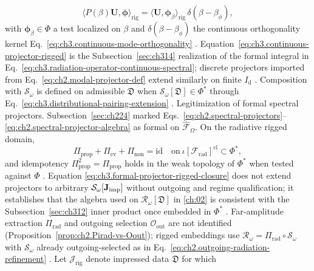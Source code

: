 \begin{equation}
\label{eq:ch3.continuous-projector-rigged}
\big\langle P(\beta)\mathbf{U},\boldsymbol{\phi}\big\rangle_{\mathrm{rig}}
=
\big\langle \mathbf{U},\boldsymbol{\phi}_\beta\rangle_{\mathrm{rig}}\,
\delta(\beta-\beta_\phi),
\end{equation}
with \(\boldsymbol{\phi}_\beta\in\Phi\) a test localized on \(\beta\) and \(\delta(\beta-\beta_\phi)\) the
continuous orthogonality kernel Eq.~\eqref{eq:ch3.continuous-mode-orthogonality} \cite{stratton1941}.
Equation~\eqref{eq:ch3.continuous-projector-rigged} is the Subsection~\ref{sec:ch314} realization of the
formal integral in Eq.~\eqref{eq:ch3.radiation-operator-continuous-spectral}; discrete projectors imported
from Eq.~\eqref{eq:ch2.modal-projector-def} extend similarly on finite \(I_{\mathrm{d}}\)
\cite{stratton1941}. Composition with \(\mathcal{S}_\omega\) is defined on admissible
\(\mathfrak{D}\) when \(\mathcal{S}_\omega[\mathfrak{D}]\in\Phi^{*}\) through
Eq.~\eqref{eq:ch3.distributional-pairing-extension} \cite{stratton1941}.
Legitimization of formal spectral projectors. Subsection~\ref{sec:ch224} marked Eqs.~\eqref{eq:ch2.spectral-projectors}--\eqref{eq:ch2.spectral-projector-algebra}
as formal on \(\widehat{\mathcal{F}}_\Omega\). On the radiative rigged domain,
\begin{equation}
\label{eq:ch3.formal-projector-rigged-closure}
\Pi_{\mathrm{prop}}+\Pi_{\mathrm{ev}}+\Pi_{\mathrm{non}}
=
\mathrm{id}
\quad\text{on}\ \iota[\mathcal{F}_{\mathrm{rad}}]^{\mathrm{cl}}\subset\Phi^{*},
\end{equation}
and idempotency \(\Pi_{\mathrm{prop}}^{2}=\Pi_{\mathrm{prop}}\) holds in the weak topology of
\(\Phi^{*}\) when tested against \(\Phi\) \cite{stratton1941}. Equation
\eqref{eq:ch3.formal-projector-rigged-closure} does not extend projectors to arbitrary
\(\mathcal{S}_\omega[\mathbf{J}_{\mathrm{imp}}]\) without outgoing and regime qualification; it establishes that the algebra
used on \(\mathcal{R}_\omega[\mathfrak{D}]\) in \ref{ch:02} is consistent with the
Subsection~\ref{sec:ch312} inner product once embedded in \(\Phi^{*}\) \cite{harrington2001}.
Far-amplitude extraction $\Pi_{\mathrm{rad}}$ and outgoing selection $\mathcal{O}_{\mathrm{out}}$ are not
identified (Proposition~\ref{prop:ch2.Pirad-vs-Oout}); rigged embeddings use
$\mathcal{R}_\omega=\Pi_{\mathrm{rad}}\circ\mathcal{S}_\omega$ with $\mathcal{S}_\omega$ already
outgoing-selected as in Eq.~\eqref{eq:ch2.outgoing-radiation-refinement} \cite{stratton1941}.
Let \(\mathcal{J}_{\mathrm{rig}}\) denote impressed data \(\mathfrak{D}\) for which
